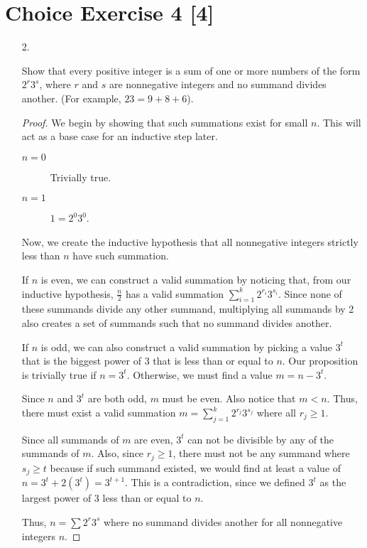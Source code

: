 \documentclass{article}
\begin{document}
\section*{Choice Exercise 4 [4]}

\begin{enumerate}
    \item[2.] {
        Show that every positive integer is a sum of one or more numbers of the 
        form \(2^r3^s\), where \(r\) and \(s\) are nonnegative integers and no 
        summand divides another. (For example, \(23 = 9 + 8 + 6\)).

        \begin{proof}
            We begin by showing that such summations exist for small \(n\). This 
            will act as a base case for an inductive step later.

            \begin{description}
                \item[\(n=0\)] Trivially true.
                \item[\(n=1\)] \(1 = 2^0 3^0\).
            \end{description}

            Now, we create the inductive hypothesis that all nonnegative 
            integers strictly less than \(n\) have such summation.

            If \(n\) is even, we can construct a valid summation by noticing 
            that, from our inductive hypothesis, \(\frac{n}{2}\) has a valid summation 
            \(\sum_{i=1}^{k}2^{r_i}3^{s_i}\). Since none of these summands divide 
            any other summand, multiplying all summands by 2 also creates a set 
            of summands such that no summand divides another.

            If \(n\) is odd, we can also construct a valid summation by picking 
            a value \(3^t\) that is the biggest power of 3 that is less than or 
            equal to \(n\). Our proposition is trivially true if \(n = 3^t\). 
            Otherwise, we must find a value \(m = n - 3^t\).

            Since \(n\) and \(3^t\) are both odd, \(m\) must be even. Also notice 
            that \(m < n\). Thus, there must exist a valid summation
            \(m = \sum_{j=1}^{k}2^{r_j}3^{s_j}\) where all \(r_j \ge 1\).

            Since all summands of \(m\) are even, \(3^t\) can not be divisible 
            by any of the summands of \(m\). Also, since \(r_j \ge 1\), there 
            must not be any summand where \(s_j \ge t\) because if such summand 
            existed, we would find at least a value of 
            \(n = 3^t + 2(3^t) = 3^{t+1}\). This is a contradiction, since we 
            defined \(3^t\) as the largest power of 3 less than or equal to \(n\).

            Thus, \(n = \sum 2^r3^s\) where no summand divides another for all 
            nonnegative integers \(n\).
        \end{proof}
    }
\end{enumerate}
\end{document}
